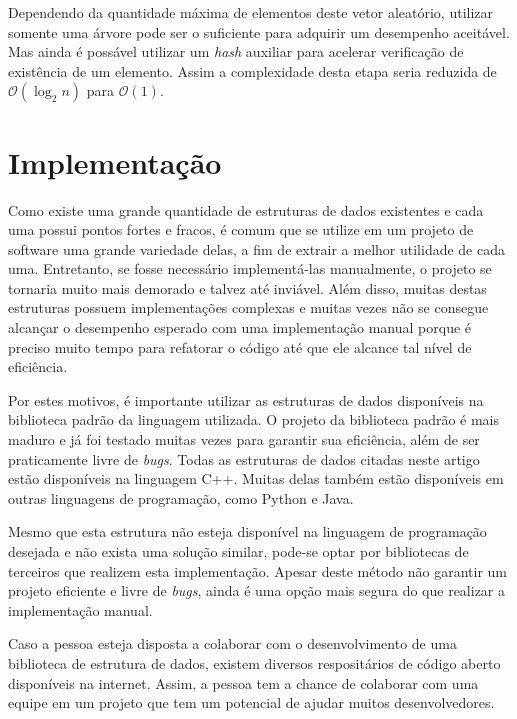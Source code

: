 \documentclass[12pt]{article}
\begin{document}
Dependendo da quantidade m\'{a}xima de elementos deste vetor aleat\'{o}rio, utilizar somente uma \'{a}rvore pode
ser o suficiente para adquirir um desempenho aceit\'{a}vel. Mas ainda \'{e} poss\'{a}vel utilizar um \textit{hash}
auxiliar para acelerar verifica\c{c}\~{a}o de exist\^{e}ncia de um elemento. Assim a complexidade desta etapa seria
reduzida de $\mathcal{O}(\log_2n)$ para $\mathcal{O}(1)$.

\section{Implementa\c{c}\~{a}o}

Como existe uma grande quantidade de estruturas de dados existentes e cada uma possui pontos fortes e fracos,
\'{e} comum que se utilize em um projeto de software uma grande variedade delas, a fim de extrair a melhor utilidade
de cada uma. Entretanto, se fosse necess\'{a}rio implement\'{a}-las manualmente, o projeto se tornaria muito mais
demorado e talvez at\'{e} invi\'{a}vel. Al\'{e}m disso, muitas destas estruturas possuem implementa\c{c}\~{o}es
complexas e muitas vezes n\~{a}o se consegue alcan\c{c}ar o desempenho esperado com uma implementa\c{c}\~{a}o manual
porque \'{e} preciso muito tempo para refatorar o c\'{o}digo at\'{e} que ele alcance tal n\'{i}vel de efici\^{e}ncia.

Por estes motivos, \'{e} importante utilizar as estruturas de dados dispon\'{i}veis na biblioteca padr\~{a}o da linguagem
utilizada. O projeto da biblioteca padr\~{a}o \'{e} mais maduro e j\'{a} foi testado muitas vezes para garantir sua
efici\^{e}ncia, al\'{e}m de ser praticamente livre de \textit{bugs}. Todas as estruturas de dados citadas neste artigo
est\~{a}o dispon\'{i}veis na linguagem C++. Muitas delas tamb\'{e}m est\~{a}o dispon\'{i}veis em outras linguagens de
programa\c{c}\~{a}o, como Python e Java.

Mesmo que esta estrutura n\~{a}o esteja dispon\'{i}vel na linguagem de programa\c{c}\~{a}o desejada e n\~{a}o exista
uma solu\c{c}\~{a}o similar, pode-se optar por bibliotecas de terceiros que realizem esta implementa\c{c}\~{a}o. Apesar deste
m\'{e}todo n\~{a}o garantir um projeto eficiente e livre de \textit{bugs}, ainda \'{e} uma op\c{c}\~{a}o mais segura
do que realizar a implementa\c{c}\~{a}o manual.

Caso a pessoa esteja disposta a colaborar com o desenvolvimento de uma biblioteca de estrutura de dados, existem
diversos resposit\'{a}rios de c\'{o}digo aberto dispon\'{i}veis na internet. Assim, a pessoa tem a chance de
colaborar com uma equipe em um projeto que tem um potencial de ajudar muitos desenvolvedores.
\end{document}

